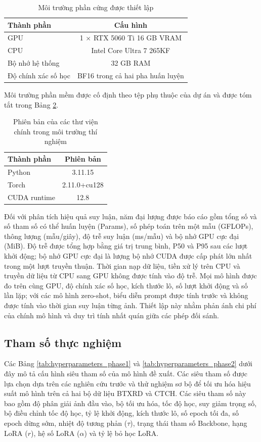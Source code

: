 \begin{table}[htbp]
\centering
\caption{Môi trường phần cứng được thiết lập}
\label{tab:hardware_environment}
\begin{tabular}{|l|c|}
\hline
\textbf{Thành phần} & \textbf{Cấu hình} \\ \hline
GPU & 1 $\times$ RTX 5060 Ti 16 GB VRAM \\ \hline
CPU & Intel Core Ultra 7 265KF \\ \hline
Bộ nhớ hệ thống & 32 GB RAM \\ \hline
Độ chính xác số học & BF16 trong cả hai pha huấn luyện \\ \hline
\end{tabular}
\end{table}

Môi trường phần mềm được cố định theo tệp phụ thuộc của dự án và được tóm tắt
trong Bảng \ref{tab:software_environment}.
\begin{table}[htbp]
\centering
\caption{Phiên bản của các thư viện chính trong môi trường thí nghiệm}
\label{tab:software_environment}
\begin{tabular}{|l|c|}
\hline
\textbf{Thành phần} & \textbf{Phiên bản} \\ \hline
Python & 3.11.15 \\ \hline
Torch & 2.11.0+cu128 \\ \hline
CUDA runtime & 12.8 \\ \hline
\end{tabular}
\end{table}

Đối với phân tích hiệu quả suy luận, năm đại lượng được báo cáo gồm tổng số và số tham số có thể huấn luyện (Params), số phép toán trên một mẫu (GFLOPs), thông lượng (mẫu/giây), độ trễ suy luận (ms/mẫu) và bộ nhớ GPU cực đại (MiB). Độ trễ được tổng hợp bằng giá trị trung bình, P50 và P95 sau các lượt khởi động; bộ nhớ GPU cực đại là lượng bộ nhớ CUDA được cấp phát lớn nhất trong một lượt truyền thuận. Thời gian nạp dữ liệu, tiền xử lý trên CPU và truyền dữ liệu từ CPU sang GPU không được tính vào độ trễ. Mọi mô hình được đo trên cùng GPU, độ chính xác số học, kích thước lô, số lượt khởi động và số lần lặp; với các mô hình zero-shot, biểu diễn prompt được tính trước và không được tính vào thời gian suy luận từng ảnh. Thiết lập này nhằm phản ánh chi phí của chính mô hình và duy trì tính nhất quán giữa các phép đối sánh.

\subsection{Tham số thực nghiệm}
Các Bảng \ref{tab:hyperparameters_phase1} và \ref{tab:hyperparameters_phase2} dưới đây mô tả cấu hình siêu tham số của mô hình đề xuất. Các siêu tham số được lựa chọn dựa trên các nghiên cứu trước và thử nghiệm sơ bộ để tối ưu hóa hiệu suất mô hình trên cả hai bộ dữ liệu BTXRD và CTCH. Các siêu tham số này bao gồm độ phân giải ảnh đầu vào, bộ tối ưu hóa, tốc độ học, suy giảm trọng số, bộ điều chỉnh tốc độ học, tỷ lệ khởi động, kích thước lô, số epoch tối đa, số epoch dừng sớm, nhiệt độ tương phản ($\tau$), trạng thái tham số Backbone, hạng LoRA ($r$), hệ số LoRA ($\alpha$) và tỷ lệ bỏ học LoRA.

